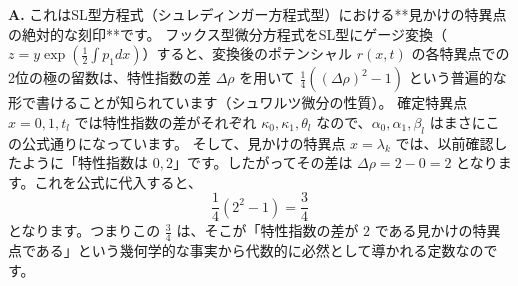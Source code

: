 \begin{Q}[【深掘り】式(3.85)の見かけの特異点 $x=\lambda_k$ の項にある「$3/4$」という数字はどこから来たのか？]
\textbf{A.} これはSL型方程式（シュレディンガー方程式型）における**見かけの特異点の絶対的な刻印**です。
フックス型微分方程式をSL型にゲージ変換（$z = y \exp(\frac{1}{2}\int p_1 dx)$）すると、変換後のポテンシャル $r(x,t)$ の各特異点での2位の極の留数は、特性指数の差 $\Delta \rho$ を用いて $\frac{1}{4}((\Delta \rho)^2 - 1)$ という普遍的な形で書けることが知られています（シュワルツ微分の性質）。
確定特異点 $x=0, 1, t_l$ では特性指数の差がそれぞれ $\kappa_0, \kappa_1, \theta_l$ なので、$\alpha_0, \alpha_1, \beta_l$ はまさにこの公式通りになっています。
そして、見かけの特異点 $x=\lambda_k$ では、以前確認したように「特性指数は $0, 2$」です。したがってその差は $\Delta \rho = 2 - 0 = 2$ となります。これを公式に代入すると、
$$ \frac{1}{4}(2^2 - 1) = \frac{3}{4} $$
となります。つまりこの $\frac{3}{4}$ は、そこが「特性指数の差が $2$ である見かけの特異点である」という幾何学的な事実から代数的に必然として導かれる定数なのです。
\end{Q}

